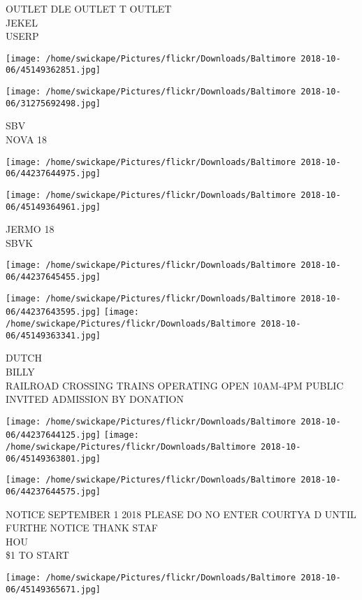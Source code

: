\documentclass[10pt,letterpaper]{article}
\begin{document}
OUTLET DLE OUTLET T OUTLET\\
JEKEL\\
USERP
\pagebreak

\texttt{[image: /home/swickape/Pictures/flickr/Downloads/Baltimore 2018-10-06/45149362851.jpg]}

\vspace{0.25in}
\texttt{[image: /home/swickape/Pictures/flickr/Downloads/Baltimore 2018-10-06/31275692498.jpg]}

SBV\\
NOVA 18
\pagebreak

\texttt{[image: /home/swickape/Pictures/flickr/Downloads/Baltimore 2018-10-06/44237644975.jpg]}

\vspace{0.25in}
\texttt{[image: /home/swickape/Pictures/flickr/Downloads/Baltimore 2018-10-06/45149364961.jpg]}

JERMO 18\\
SBVK
\pagebreak

\texttt{[image: /home/swickape/Pictures/flickr/Downloads/Baltimore 2018-10-06/44237645455.jpg]}

\vspace{0.25in}
\texttt{[image: /home/swickape/Pictures/flickr/Downloads/Baltimore 2018-10-06/44237643595.jpg]}
\texttt{[image: /home/swickape/Pictures/flickr/Downloads/Baltimore 2018-10-06/45149363341.jpg]}

DUTCH\\
BILLY\\
RAILROAD CROSSING TRAINS OPERATING OPEN 10AM{-}4PM PUBLIC INVITED ADMISSION BY DONATION
\pagebreak

\texttt{[image: /home/swickape/Pictures/flickr/Downloads/Baltimore 2018-10-06/44237644125.jpg]}
\texttt{[image: /home/swickape/Pictures/flickr/Downloads/Baltimore 2018-10-06/45149363801.jpg]}

\texttt{[image: /home/swickape/Pictures/flickr/Downloads/Baltimore 2018-10-06/44237644575.jpg]}

NOTICE SEPTEMBER 1 2018 PLEASE DO NO ENTER COURTYA D UNTIL FURTHE NOTICE THANK STAF\\
HOU\\
\$1 TO START
\pagebreak

\texttt{[image: /home/swickape/Pictures/flickr/Downloads/Baltimore 2018-10-06/45149365671.jpg]}
\end{document}
